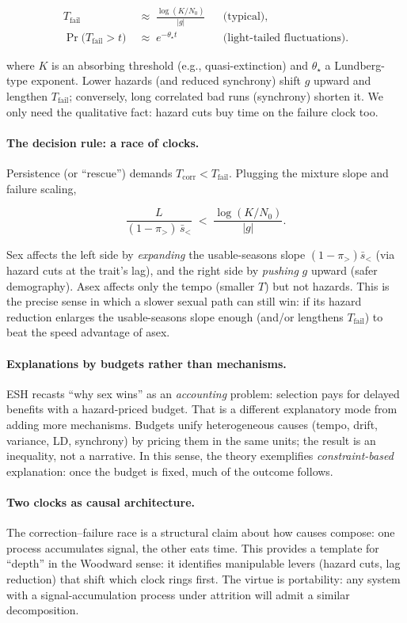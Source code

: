 \documentclass[11pt]{article}
\theoremstyle{upright}
\begin{document}
\begin{align}
T_{\mathrm{fail}} \;&\approx\; \frac{\log(K/N_0)}{|g|} && \text{(typical)},\\[3pt]
\Pr\!\big(T_{\mathrm{fail}}>t\big) \;&\approx\; e^{-\theta_\star t} && \text{(light-tailed fluctuations)}.
\end{align}

where $K$ is an absorbing threshold (e.g., quasi-extinction) and $\theta_\star$ a Lundberg-type exponent. Lower hazards (and reduced synchrony) shift $g$ upward and lengthen $T_{\mathrm{fail}}$; conversely, long correlated bad runs (synchrony) shorten it. We only need the qualitative fact: hazard cuts buy time on the failure clock too.

\paragraph{The decision rule: a race of clocks.}
Persistence (or “rescue”) demands $T_{\mathrm{corr}}<T_{\mathrm{fail}}$. Plugging the mixture slope and failure scaling,

$$
\frac{L}{(1-\pi_{>})\,\bar s_{<}}\;<\;\frac{\log(K/N_0)}{|g|}.
$$

Sex affects the left side by \emph{expanding} the usable-seasons slope $(1-\pi_{>})\bar s_{<}$ (via hazard cuts at the trait’s lag), and the right side by \emph{pushing} $g$ upward (safer demography). Asex affects only the tempo (smaller $T$) but not hazards. This is the precise sense in which a slower sexual path can still win: if its hazard reduction enlarges the usable-seasons slope enough (and/or lengthens $T_{\mathrm{fail}}$) to beat the speed advantage of asex.

\paragraph{Explanations by budgets rather than mechanisms.}
ESH recasts “why sex wins” as an \emph{accounting} problem: selection pays for delayed benefits with a hazard-priced budget.
That is a different explanatory mode from adding more mechanisms.
Budgets unify heterogeneous causes (tempo, drift, variance, LD, synchrony) by pricing them in the same units; the result is an inequality, not a narrative.
In this sense, the theory exemplifies \emph{constraint-based} explanation: once the budget is fixed, much of the outcome follows.

\paragraph{Two clocks as causal architecture.}
The correction–failure race is a structural claim about how causes compose: one process accumulates signal, the other eats time.
This provides a template for “depth” in the Woodward sense: it identifies manipulable levers (hazard cuts, lag reduction) that shift which clock rings first.
The virtue is portability: any system with a signal-accumulation process under attrition will admit a similar decomposition.
\end{document}
